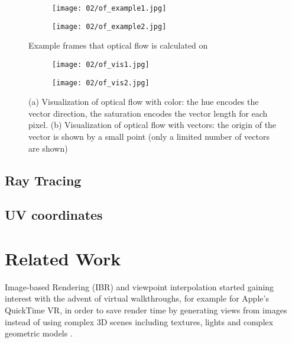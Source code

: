 \begin{figure}
\centering
    \begin{subfigure}[b]{0.5\textwidth}            
            \centering
            \texttt{[image: 02/of\_example1.jpg]}
            \caption{}
    \end{subfigure}%
    \begin{subfigure}[b]{0.5\textwidth}
            \centering
            \texttt{[image: 02/of\_example2.jpg]}
            \caption{}
    \end{subfigure}
    \caption[Optical flow example]{Example frames that optical flow is calculated on}\label{fig:of_example_bike}

    \quad
    \begin{subfigure}[b]{0.5\textwidth}            
            \centering
            \texttt{[image: 02/of\_vis1.jpg]}
            \caption{}
    \end{subfigure}%
    \begin{subfigure}[b]{0.5\textwidth}
            \centering
            \texttt{[image: 02/of\_vis2.jpg]}
            \caption{}
    \end{subfigure}
    \caption[Optical flow visualizations]{(a) Visualization of optical flow with color: the hue encodes the vector direction, the saturation encodes the vector length for each pixel. (b) Visualization of optical flow with vectors: the origin of the vector is shown by a small point (only a limited number of vectors are shown)}\label{fig:of_vis}
\end{figure}

\subsection{Ray Tracing}
\subsection{UV coordinates}

\section{Related Work}
Image-based Rendering (IBR) and viewpoint interpolation started gaining interest with the advent of virtual walkthroughs, for example for Apple's QuickTime\textsuperscript{\textregistered} VR, in order to save render time by generating views from images instead of using complex 3D scenes including textures, lights and complex geometric models \cite{quicktime}.

